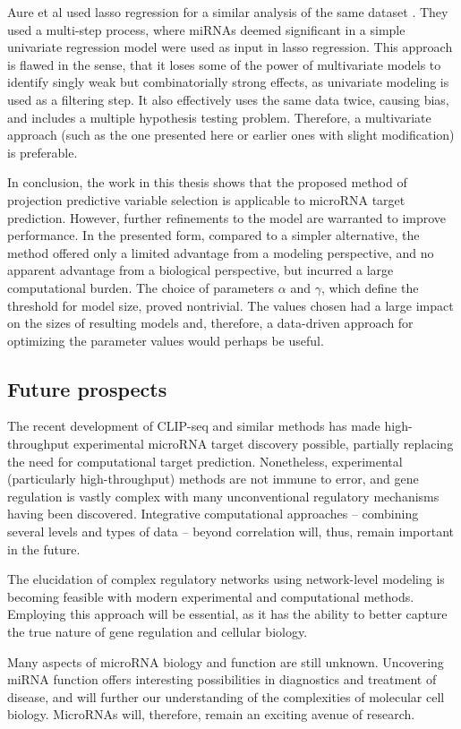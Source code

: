 Aure et al used lasso regression for a similar analysis of the same dataset
\citep{Aure2015}. They used a multi-step process, where miRNAs deemed
significant in a simple univariate regression model were used as input in
lasso regression. This approach is flawed in the sense, that it loses some of
the power of multivariate models to identify singly weak but combinatorially
strong effects, as univariate modeling is used as a filtering step. It also
effectively uses the same data twice, causing bias, and includes a
multiple hypothesis testing problem. Therefore, a multivariate
approach (such as the one presented here or earlier ones with slight modification)
is preferable.

In conclusion, the work in this thesis shows that the proposed method of
projection predictive variable selection is applicable to microRNA target
prediction. However, further refinements to the model are warranted to improve
performance. In the presented form, compared to a simpler alternative, the
method offered only a limited advantage from a modeling perspective, and no
apparent advantage from a biological perspective, but incurred a large
computational burden. The choice of parameters $\alpha$ and $\gamma$, which
define the threshold for model size, proved nontrivial. The values chosen
had a large impact on the sizes of resulting models and, therefore,
a data-driven approach for optimizing the parameter values would perhaps be useful.




\subsection*{Future prospects}

The recent development of CLIP-seq and similar methods has made high-
throughput experimental microRNA target discovery possible, partially
replacing the need for computational target prediction. Nonetheless,
experimental (particularly high-throughput) methods are not immune to error,
and gene regulation is vastly complex with many unconventional regulatory
mechanisms having been discovered. Integrative computational approaches --
combining several levels and types of data -- beyond correlation will, thus,
remain important in the future.

The elucidation of complex regulatory networks using network-level modeling is
becoming feasible with modern experimental and computational methods.
Employing this approach will be essential, as it has the ability to better
capture the true nature of gene regulation and cellular biology.

Many aspects of microRNA biology and function are still unknown. Uncovering
miRNA function offers interesting possibilities in diagnostics and treatment
of disease, and will further our understanding of the complexities of
molecular cell biology. MicroRNAs will, therefore, remain an exciting avenue
of research.
